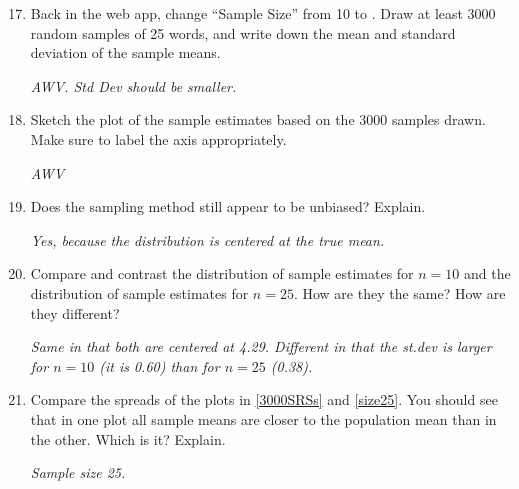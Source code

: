      \begin{enumerate}
       \setcounter{enumi}{16}
     \item Back in the web app, change ``Sample Size'' from 10 to . 
       Draw at least 3000 random samples of 25 words, and write down
       the mean and standard deviation of the sample means.
\begin{students}
  \vspace{1cm}
\end{students}    
\begin{key}
   {\it  AWV. Std Dev should be smaller.}
\end{key}

     \item \label{size25} Sketch the plot of the sample estimates based on the
       3000 samples drawn. Make sure to label the axis appropriately. 
       \begin{students}
  \vspace{3cm}
\end{students}    
\begin{key}
   {\it  AWV}
\end{key}

     \item  Does the sampling method still appear to be unbiased? Explain.
       \begin{students}
  \vspace{1cm}
\end{students}    
\begin{key}
   {\it  Yes, because the distribution is centered at the true mean.}
\end{key}

     \item  Compare and contrast the distribution of sample estimates
       for $n = 10$ and the distribution of sample estimates for $n =
       25$. How are they the same? How are they different?  
       \begin{students}
  \vspace{2cm}
\end{students}    
\begin{key}
   {\it  Same in that both are centered at 4.29.  Different in that
     the st.dev is larger for $n=10$ (it is 0.60) than for $n = 25$
     (0.38). }
\end{key}

     \item Compare the spreads of the plots in \ref{3000SRSs} and
       \ref{size25}.   You should see that in one plot all sample
       means are closer to the population mean than in the other.
       Which is it? Explain.
\begin{students}
  \vspace{1cm}
\end{students}    
\begin{key}
   {\it  Sample size 25.}
\end{key}


\end{enumerate}
